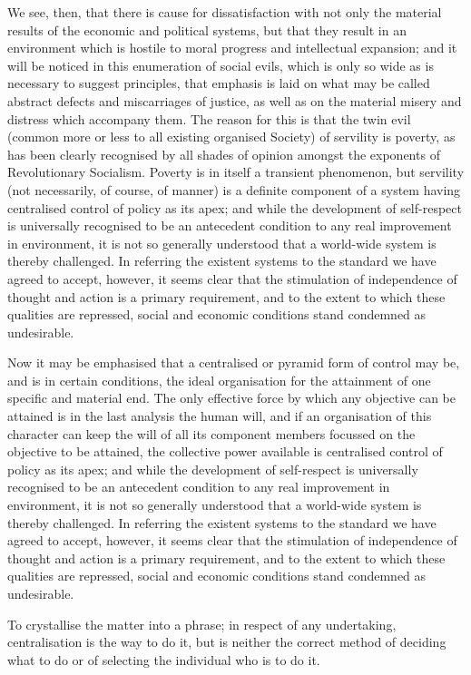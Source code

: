 \documentclass{book}
\begin{document}
We see, then, that there is cause for dissatisfaction with not only the material results of the economic and political systems, but that they result in an environment which is hostile to moral progress and intellectual expansion; and it will be noticed in this enumeration of social evils, which is only so wide as is necessary to suggest principles, that emphasis is laid on what may be called abstract defects and miscarriages of justice, as well as on the material misery and distress which accompany them. The reason for this is that the twin evil (common more or less to all existing organised Society) of servility is poverty, as has been clearly recognised by all shades of opinion amongst the exponents of Revolutionary Socialism. Poverty is in itself a transient phenomenon, but servility (not necessarily, of course, of manner) is a definite component of a system having centralised control of policy as its apex; and while the development of self-respect is universally recognised to be an antecedent condition to any real improvement in environment, it is not so generally understood that a world-wide system is thereby challenged. In referring the existent systems to the standard we have agreed to accept, however, it seems clear that the stimulation of independence of thought and action is a primary requirement, and to the extent to which these qualities are repressed, social and economic conditions stand condemned as undesirable.

Now it may be emphasised that a centralised or pyramid form of control may be, and is in certain conditions, the ideal organisation for the attainment of one specific and material end. The only effective force by which any objective can be attained is in the last analysis the human will, and if an organisation of this character can keep the will of all its component members focussed on the objective to be attained, the collective power available is centralised control of policy as its apex; and while the development of self-respect is universally recognised to be an antecedent condition to any real improvement in environment, it is not so generally understood that a world-wide system is thereby challenged. In referring the existent systems to the standard we have agreed to accept, however, it seems clear that the stimulation of independence of thought and action is a primary requirement, and to the extent to which these qualities are repressed, social and economic conditions stand condemned as undesirable.

To crystallise the matter into a phrase; in respect of any undertaking, centralisation is the way to do it, but is neither the correct method of deciding what to do or of selecting the individual who is to do it.
\end{document}
